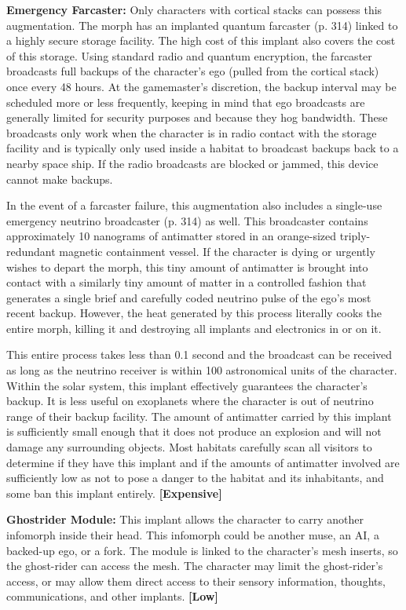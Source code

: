 \textbf{Emergency Farcaster: }Only characters with cortical
stacks can possess this augmentation. The morph
has an implanted quantum farcaster (p. 314) linked 
to a highly secure storage facility. The high cost of 
this implant also covers the cost of this storage. Using 
standard radio and quantum encryption, the farcaster 
broadcasts full backups of the character's ego (pulled 
from the cortical stack) once every 48 hours. At the 
gamemaster's discretion, the backup interval may be 
scheduled more or less frequently, keeping in mind 
that ego broadcasts are generally limited for security 
purposes and because they hog bandwidth. These 
broadcasts only work when the character is in radio 
contact with the storage facility and is typically only 
used inside a habitat to broadcast backups back to a 
nearby space ship. If the radio broadcasts are blocked 
or jammed, this device cannot make backups.

In the event of a farcaster failure, this augmentation 
also includes a single-use emergency neutrino broadcaster
(p. 314) as well. This broadcaster contains approximately
10 nanograms of antimatter stored in an
orange-sized triply-redundant magnetic containment 
vessel. If the character is dying or urgently wishes to 
depart the morph, this tiny amount of antimatter is 
brought into contact with a similarly tiny amount of 
matter in a controlled fashion that generates a single 
brief and carefully coded neutrino pulse of the ego's 
most recent backup. However, the heat generated by 
this process literally cooks the entire morph, killing it 
and destroying all implants and electronics in or on it.

This entire process takes less than 0.1 second and 
the broadcast can be received as long as the neutrino
receiver is within 100 astronomical units of
the character. Within the solar system, this implant 
effectively guarantees the character's backup. It is less 
useful on exoplanets where the character is out of 
neutrino range of their backup facility. The amount 
of antimatter carried by this implant is sufficiently 
small enough that it does not produce an explosion 
and will not damage any surrounding objects. Most 
habitats carefully scan all visitors to determine if they 
have this implant and if the amounts of antimatter 
involved are sufficiently low as not to pose a danger 
to the habitat and its inhabitants, and some ban this 
implant entirely. \textbf{[Expensive]}

\textbf{Ghostrider Module:} This implant allows the 
character to carry another infomorph inside their 
head. This infomorph could be another muse, an AI, 
a backed-up ego, or a fork. The module is linked to 
the character's mesh inserts, so the ghost-rider can 
access the mesh. The character may limit the ghost-rider's
access, or may allow them direct access to their
sensory information, thoughts, communications, and 
other implants. \textbf{[Low]}

